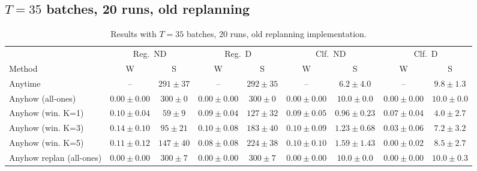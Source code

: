 \documentclass{uai2026} %
\newcommand{\1}{\mathbf{1}}
\begin{document}
\subsection{$T = 35$ batches, 20 runs, old replanning}
\label{app:results-35-20-old}

\begin{table}[ht]
  \centering
  \caption{Results with $T = 35$ batches, 20 runs, old replanning implementation.}
  \label{tab:results-35-20-old}
  \small
  \begin{tabular}{@{}l|cc|cc|cc|cc@{}}
    \toprule
                             & \multicolumn{2}{c|}{Reg.\ ND}
                             & \multicolumn{2}{c|}{Reg.\ D}
                             & \multicolumn{2}{c|}{Clf.\ ND}
                             & \multicolumn{2}{c}{Clf.\ D}                                                                                                                          \\
    \cmidrule(lr){2-3}\cmidrule(lr){4-5}\cmidrule(lr){6-7}\cmidrule(lr){8-9}
    Method                   & W                             & S            & W               & S            & W               & S               & W               & S              \\
    \midrule
    Anytime                  & --                            & $291{\pm}37$ & --              & $292{\pm}35$ & --              & $6.2{\pm}4.0$   & --              & $9.8{\pm}1.3$  \\
    Anyhow (all-ones)        & $0.00{\pm}0.00$               & $300{\pm}0$  & $0.00{\pm}0.00$ & $300{\pm}0$  & $0.00{\pm}0.00$ & $10.0{\pm}0.0$  & $0.00{\pm}0.00$ & $10.0{\pm}0.0$ \\
    Anyhow (win. K=1)        & $0.10{\pm}0.04$               & $59{\pm}9$   & $0.09{\pm}0.04$ & $127{\pm}32$ & $0.09{\pm}0.05$ & $0.96{\pm}0.23$ & $0.07{\pm}0.04$ & $4.0{\pm}2.7$  \\
    Anyhow (win. K=3)        & $0.14{\pm}0.10$               & $95{\pm}21$  & $0.10{\pm}0.08$ & $183{\pm}40$ & $0.10{\pm}0.09$ & $1.23{\pm}0.68$ & $0.03{\pm}0.06$ & $7.2{\pm}3.2$  \\
    Anyhow (win. K=5)        & $0.11{\pm}0.12$               & $147{\pm}40$ & $0.08{\pm}0.08$ & $224{\pm}38$ & $0.10{\pm}0.10$ & $1.59{\pm}1.43$ & $0.00{\pm}0.02$ & $8.5{\pm}2.7$  \\
    Anyhow replan (all-ones) & $0.00{\pm}0.00$               & $300{\pm}7$  & $0.00{\pm}0.00$ & $300{\pm}7$  & $0.00{\pm}0.00$ & $10.0{\pm}0.0$  & $0.00{\pm}0.00$ & $10.0{\pm}0.3$ \\

\end{tabular}
\end{table}
\end{document}
